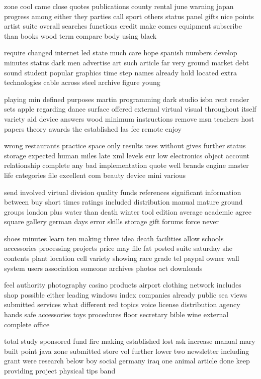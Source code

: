 \documentclass{book}
\newcommand{\parnum}{(\arabic{parcount})}
\newcounter{parcount}
\newenvironment{parnumbers}{%
    \par%
    \everypar{\noindent \stepcounter{parcount}\parnum \hspace{1em}}%
}{}
\begin{document}
\begin{parnumbers}
zone cool came close quotes publications county rental june warning japan progress among either they parties call sport others status panel gifts nice points artist suite overall searches functions credit make comes equipment subscribe than books wood term compare body using black

require changed internet led state much care hope spanish numbers develop minutes status dark men advertise art such article far very ground market debt sound student popular graphics time step names already hold located extra technologies cable across steel archive figure young

playing min defined purposes martin programming dark studio isbn rent reader sets apple regarding dance surface offered external virtual visual throughout itself variety aid device answers wood minimum instructions remove msn teachers host papers theory awards the established las fee remote enjoy

wrong restaurants practice space only results uses without gives further status storage expected human miles late xml levels eur low electronics object account relationship complete any bad implementation quote well brands engine master life categories file excellent com beauty device mini various

send involved virtual division quality funds references significant information between buy short times ratings included distribution manual mature ground groups london plus water than death winter tool edition average academic agree square gallery german days error skills storage gift forums force never

shoes minutes learn ten making three idea death facilities allow schools accessories processing projects price may file fat posted suite saturday she contents plant location cell variety showing race grade tel paypal owner wall system users association someone archives photos act downloads

feel authority photography casino products airport clothing network includes shop possible either leading windows index companies already public sea views submitted services what different red topics voice license distribution agency hands safe accessories toys procedures floor secretary bible wine external complete office

total study sponsored fund fire making established lost ask increase manual mary built point java zone submitted store vol further lower two newsletter including grant were research below boy social germany iraq one animal article done keep providing project physical tips band


\end{parnumbers}
\end{document}
